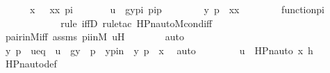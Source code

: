 \begin{isabellebody}
\ \ \ \ \ \ {\isacharless}{\kern0pt}x{\isacharcomma}{\kern0pt}\ {\isasympi}{\isachargreater}{\kern0pt}\ {\isacharequal}{\kern0pt}\ {\isacharless}{\kern0pt}xx{\isacharcomma}{\kern0pt}\ pi{\isachargreater}{\kern0pt}\ {\isasymand}\isanewline
\ \ \ \ \ \ u\ {\isacharequal}{\kern0pt}\ {\isacharless}{\kern0pt}g{\isacharbackquote}{\kern0pt}{\isacharless}{\kern0pt}y{\isacharcomma}{\kern0pt}pi{\isachargreater}{\kern0pt}{\isacharcomma}{\kern0pt}\ pi{\isacharbackquote}{\kern0pt}p{\isachargreater}{\kern0pt}\ {\isasymand}\ \isanewline
\ \ \ \ \ \ {\isacharless}{\kern0pt}y{\isacharcomma}{\kern0pt}\ p{\isachargreater}{\kern0pt}\ {\isasymin}\ xx\ {\isasymand}\ \isanewline
\ \ \ \ \ \ function{\isacharparenleft}{\kern0pt}pi{\isacharparenright}{\kern0pt}\isanewline
\ \ \ \ {\isacharparenright}{\kern0pt}{\isachardoublequoteclose}\ \isanewline
\ \ \ \ \ \ \isamarkupfalse%
{\isacharparenleft}{\kern0pt}rule\ iffD{}{\isacharcomma}{\kern0pt}\ rule{\isacharunderscore}{\kern0pt}tac\ HPn{\isacharunderscore}{\kern0pt}auto{\isacharunderscore}{\kern0pt}M{\isacharunderscore}{\kern0pt}cond{\isacharunderscore}{\kern0pt}iff{\isacharparenright}{\kern0pt}\isanewline
\ \ \ \ \ \ \isamarkupfalse%
\ pair{\isacharunderscore}{\kern0pt}in{\isacharunderscore}{\kern0pt}M{\isacharunderscore}{\kern0pt}iff\ assms{}\ piinM\ uH\isanewline
\ \ \ \ \ \ \isamarkupfalse%
\ auto\isanewline
\ \ \ \ \isamarkupfalse%
\ \isamarkupfalse%
\ y\ p\ \ ueq\ {\isacharcolon}{\kern0pt}\ {\isachardoublequoteopen}u\ {\isacharequal}{\kern0pt}\ {\isacharless}{\kern0pt}g{\isacharbackquote}{\kern0pt}{\isacharless}{\kern0pt}y{\isacharcomma}{\kern0pt}\ {\isasympi}{\isachargreater}{\kern0pt}{\isacharcomma}{\kern0pt}\ {\isasympi}{\isacharbackquote}{\kern0pt}p{\isachargreater}{\kern0pt}{\isachardoublequoteclose}\ \ ypin\ {\isacharcolon}{\kern0pt}\ {\isachardoublequoteopen}{\isacharless}{\kern0pt}y{\isacharcomma}{\kern0pt}\ p{\isachargreater}{\kern0pt}\ {\isasymin}\ x{\isachardoublequoteclose}\ \isamarkupfalse%
\ auto\ \isanewline
\ \ \ \ \isamarkupfalse%
\ \isamarkupfalse%
\ {\isachardoublequoteopen}u\ {\isasymin}\ HPn{\isacharunderscore}{\kern0pt}auto{\isacharparenleft}{\kern0pt}{\isasympi}{\isacharcomma}{\kern0pt}\ x{\isacharcomma}{\kern0pt}\ h{\isacharparenright}{\kern0pt}{\isachardoublequoteclose}\ \isanewline
\ \ \ \ \ \ \isamarkupfalse%
\ HPn{\isacharunderscore}{\kern0pt}auto{\isacharunderscore}{\kern0pt}def\isanewline

\end{isabellebody}
